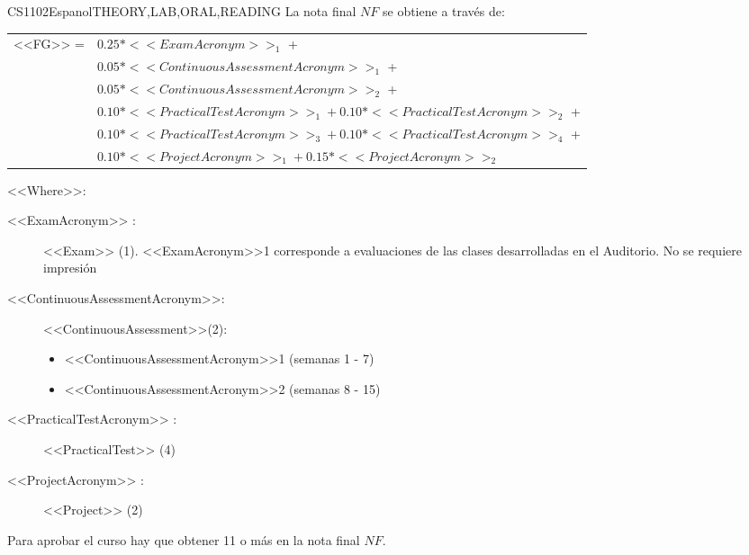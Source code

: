     
    \begin{evaluation}{CS1102}{Espanol}{THEORY,LAB,ORAL,READING}
    La nota final $NF$ se obtiene a través de: \\
    
    \begin{tabular}{cl}
      <<FG>> =  & $0.25*<<ExamAcronym>>_{1}$ +\\
                & $0.05*<<ContinuousAssessmentAcronym>>_{1}$ +  \\
                & $0.05*<<ContinuousAssessmentAcronym>>_{2}$ + \\
                & $0.10*<<PracticalTestAcronym>>_{1} + 0.10*<<PracticalTestAcronym>>_{2}$ +\\
                & $0.10*<<PracticalTestAcronym>>_{3} + 0.10*<<PracticalTestAcronym>>_{4}$ + \\
                & $0.10*<<ProjectAcronym>>_{1} + 0.15*<<ProjectAcronym>>_{2}$
    \end{tabular}

    \noindent <<Where>>:
    \begin{description}
           \item[<<ExamAcronym>> :] <<Exam>> (1). <<ExamAcronym>>1 corresponde a evaluaciones de las clases desarrolladas en el Auditorio. No se requiere impresión
           \item[<<ContinuousAssessmentAcronym>>:]<<ContinuousAssessment>>(2):
               \begin{itemize}
                  \item <<ContinuousAssessmentAcronym>>1 (semanas 1 - 7)  
                   \item <<ContinuousAssessmentAcronym>>2 (semanas 8 - 15)
               \end{itemize}
      \item[<<PracticalTestAcronym>> :] <<PracticalTest>> (4)
      \item[<<ProjectAcronym>> :] <<Project>> (2)
    \end{description}
    
    \noindent Para aprobar el curso hay que obtener 11 o más en la nota final $NF$.
    \end{evaluation}
    
    
    
